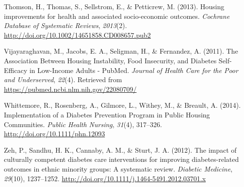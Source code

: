 \documentclass [11pt, proquest] {uwthesis}[2015/03/03]
\begin{document}
\hypertarget{ref-Thomson2013}{}
Thomson, H., Thomas, S., Sellstrom, E., \& Petticrew, M. (2013). Housing
improvements for health and associated socio-economic outcomes.
\emph{Cochrane Database of Systematic Reviews}, \emph{2013}(2).
\url{http://doi.org/10.1002/14651858.CD008657.pub2}

\hypertarget{ref-Vijayaraghavan2011}{}
Vijayaraghavan, M., Jacobs, E. A., Seligman, H., \& Fernandez, A.
(2011). The Association Between Housing Instability, Food Insecurity,
and Diabetes Self-Efficacy in Low-Income Adults - PubMed. \emph{Journal
of Health Care for the Poor and Underserved}, \emph{22}(4). Retrieved
from \url{https://pubmed.ncbi.nlm.nih.gov/22080709/}

\hypertarget{ref-Whittemore2014}{}
Whittemore, R., Rosenberg, A., Gilmore, L., Withey, M., \& Breault, A.
(2014). Implementation of a Diabetes Prevention Program in Public
Housing Communities. \emph{Public Health Nursing}, \emph{31}(4),
317--326. \url{http://doi.org/10.1111/phn.12093}

\hypertarget{ref-Zeh2012}{}
Zeh, P., Sandhu, H. K., Cannaby, A. M., \& Sturt, J. A. (2012). The
impact of culturally competent diabetes care interventions for improving
diabetes-related outcomes in ethnic minority groups: A systematic
review. \emph{Diabetic Medicine}, \emph{29}(10), 1237--1252.
\url{http://doi.org/10.1111/j.1464-5491.2012.03701.x}
\end{document}
